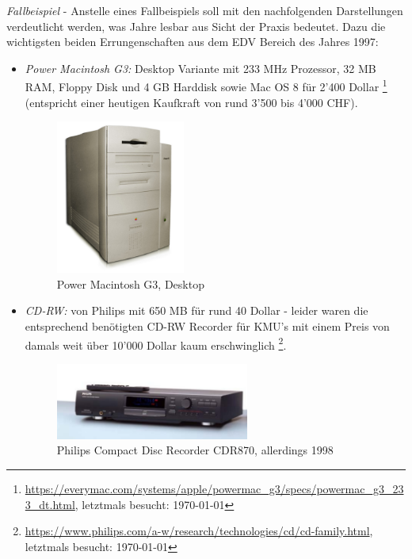 \documentclass[a4paper,pointlessnumbers]{scrreprt}
\begin{document}
\textit{Fallbeispiel} - Anstelle eines Fallbeispiels soll mit den nachfolgenden Darstellungen verdeutlicht werden, was  Jahre lesbar\grqq{} aus Sicht der Praxis bedeutet. Dazu die wichtigsten beiden Errungenschaften aus dem EDV Bereich des Jahres 1997:
\begin{itemize}
\item \textit{Power Macintosh G3:} Desktop Variante mit 233 MHz Prozessor, 32 MB RAM, Floppy Disk und 4 GB Harddisk sowie Mac OS 8 für 2'400 Dollar \footnote{\href{https://everymac.com/systems/apple/powermac\_g3/specs/powermac\_g3\_233\_dt.html}{https://everymac.com/systems/apple/powermac\_g3/specs/powermac\_g3\_233\_dt.html}, letztmals besucht: \today} (entspricht einer heutigen Kaufkraft von rund 3'500 bis 4'000 CHF).
\begin{figure}[H]
\begin{center}
\includegraphics[width=0.4\textwidth]{images/macg3.pdf}
\caption{Power Macintosh G3, Desktop}
\end{center}
\end{figure}
\item \textit{CD-RW:} von Philips mit 650 MB für rund 40 Dollar - leider waren die entsprechend benötigten CD-RW Recorder für KMU's mit einem Preis von damals weit über 10'000 Dollar kaum erschwinglich \footnote{\href{https://www.philips.com/a-w/research/technologies/cd/cd-family.html}{https://www.philips.com/a-w/research/technologies/cd/cd-family.html}, letztmals besucht: \today}.
\begin{figure}[H]
\begin{center}
\includegraphics[width=0.6\textwidth]{images/cdr870.pdf}
\caption{Philips Compact Disc Recorder CDR870, allerdings 1998}
\end{center}
\end{figure}
\end{itemize}
\end{document}
